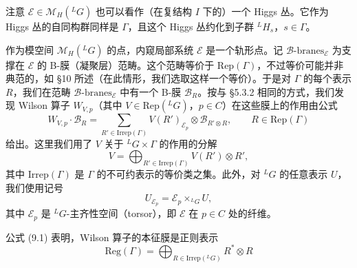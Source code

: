 \documentclass[11pt,a4paper]{article}
\begin{document}
注意 $\mathcal{E}\in\mathcal{M}_H({}^{L}G)$ 也可以看作（在复结构 $I$ 下的）一个 Higgs 丛。它作为 Higgs 丛的自同构群同样是 $\Gamma$，且这个 Higgs 丛约化到子群 ${}^{L}H_s$，$s\in\Gamma$。

作为模空间 $\mathcal{M}_H({}^{L}G)$ 的点，内窥局部系统 $\mathcal{E}$ 是一个轨形点。记 $\mathcal{B}\text{-branes}_{\mathcal{E}}$ 为支撑在 $\mathcal{E}$ 的 B-膜（凝聚层）范畴。这个范畴等价于 $\mathrm{Rep}(\Gamma)$，不过等价可能并非典范的，如 §10 所述（在此情形，我们选取这样一个等价）。于是对 $\Gamma$ 的每个表示 $R$，我们在范畴 $\mathcal{B}\text{-branes}_{\mathcal{E}}$ 中有一个 B-膜 $\mathcal{B}_R$。按与 §5.3.2 相同的方式，我们发现 Wilson 算子 $W_{V,p}$（其中 $V\in\mathrm{Rep}({}^{L}G)$，$p\in C$）在这些膜上的作用由公式
\begin{equation}\tag{9.1}
W_{V,p}\cdot\mathcal{B}_R = \sum_{R'\in\mathrm{Irrep}(\Gamma)}V(R')_{\mathcal{E}_p}\otimes\mathcal{B}_{R'\otimes R},
\qquad R\in\mathrm{Rep}(\Gamma)
\end{equation}
给出。这里我们用了 $V$ 关于 ${}^{L}G\times\Gamma$ 的作用的分解
\begin{equation}\tag{9.2}
V = \bigoplus_{R'\in\mathrm{Irrep}(\Gamma)}V(R')\otimes R',
\end{equation}
其中 $\mathrm{Irrep}(\Gamma)$ 是 $\Gamma$ 的不可约表示的等价类之集。此外，对 ${}^{L}G$ 的任意表示 $U$，我们使用记号
\[
U_{\mathcal{E}_p} = \mathcal{E}_p\times_{{}^{L}G}U,
\]
其中 $\mathcal{E}_p$ 是 ${}^{L}G$-主齐性空间（torsor），即 $\mathcal{E}$ 在 $p\in C$ 处的纤维。

公式 (9.1) 表明，Wilson 算子的本征膜是正则表示
\[
\mathrm{Reg}(\Gamma) = \bigoplus_{R\in\mathrm{Irrep}({}^{L}G)}R^*\otimes R
\]


\end{document}
